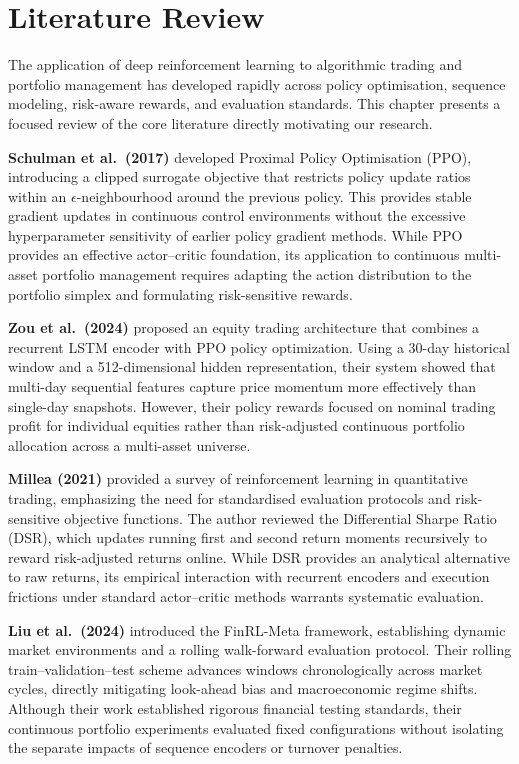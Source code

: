 \documentclass[11pt,a4paper]{article}
\numberwithin{equation}{section}
\numberwithin{table}{section}
\numberwithin{figure}{section}
\numberwithin{algorithm}{section}
\begin{document}
\section{Literature Review}\label{ch:lit}
The application of deep reinforcement learning to algorithmic trading and portfolio management has developed rapidly across policy optimisation, sequence modeling, risk-aware rewards, and evaluation standards. This chapter presents a focused review of the core literature directly motivating our research.

\textbf{Schulman et al.\ (2017)} \cite{schulman2017} developed Proximal Policy Optimisation (PPO), introducing a clipped surrogate objective that restricts policy update ratios within an $\epsilon$-neighbourhood around the previous policy. This provides stable gradient updates in continuous control environments without the excessive hyperparameter sensitivity of earlier policy gradient methods. While PPO provides an effective actor--critic foundation, its application to continuous multi-asset portfolio management requires adapting the action distribution to the portfolio simplex and formulating risk-sensitive rewards.

\textbf{Zou et al.\ (2024)} \cite{zou2024} proposed an equity trading architecture that combines a recurrent LSTM encoder with PPO policy optimization. Using a 30-day historical window and a 512-dimensional hidden representation, their system showed that multi-day sequential features capture price momentum more effectively than single-day snapshots. However, their policy rewards focused on nominal trading profit for individual equities rather than risk-adjusted continuous portfolio allocation across a multi-asset universe.

\textbf{Millea (2021)} \cite{millea2021} provided a survey of reinforcement learning in quantitative trading, emphasizing the need for standardised evaluation protocols and risk-sensitive objective functions. The author reviewed the Differential Sharpe Ratio (DSR), which updates running first and second return moments recursively to reward risk-adjusted returns online. While DSR provides an analytical alternative to raw returns, its empirical interaction with recurrent encoders and execution frictions under standard actor--critic methods warrants systematic evaluation.

\textbf{Liu et al.\ (2024)} \cite{liu2024} introduced the FinRL-Meta framework, establishing dynamic market environments and a rolling walk-forward evaluation protocol. Their rolling train--validation--test scheme advances windows chronologically across market cycles, directly mitigating look-ahead bias and macroeconomic regime shifts. Although their work established rigorous financial testing standards, their continuous portfolio experiments evaluated fixed configurations without isolating the separate impacts of sequence encoders or turnover penalties.
\end{document}
